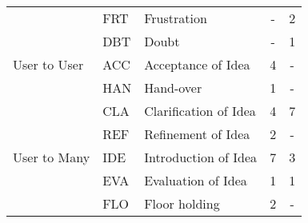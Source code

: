{{\begin{table}[h]
\begin{center}
\begin{tabular}{l|llcc}
                                     & FRT  & Frustration                           & -       & 2       \\
                                     & DBT  & Doubt                                 & -       & 1       \\
                    User to User     & ACC  & Acceptance of Idea                    & 4       & -       \\
                                     & HAN  & Hand-over                             & 1       & -       \\
                                     & CLA  & Clarification of Idea                 & 4       & 7       \\
                                     & REF  & Refinement of Idea                    & 2       & -       \\
                    User to Many     & IDE  & Introduction of Idea                  & 7       & 3       \\
                                     & EVA  & Evaluation of Idea                    & 1       & 1       \\
                                     & FLO  & Floor holding                         & 2       & -
                \end{tabular}
            \end{center}
        \end{table}

    }
}




